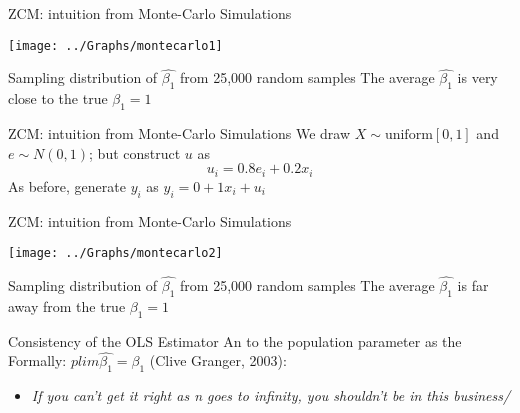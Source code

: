 \begin{frame}{ZCM: intuition from Monte-Carlo Simulations}
\begin{center}
\texttt{[image: ../Graphs/montecarlo1]}
\end{center}
Sampling distribution of $\widehat{\beta_1}$ from 25,000 random samples
\vfill
The average $\widehat{\beta_1}$ is very close to the true $\beta_1=1$
\end{frame}


\begin{frame}{ZCM: intuition from Monte-Carlo Simulations}
\vfill
We draw $X\sim \mbox{uniform}[0,1] $ and $e\sim N(0,1)$; but construct $u$ as 
\begin{equation*}
u_i=0.8 e_i + 0.2 x_i
\end{equation*}
\vfill
As before, generate $y_i$ as  $y_i=0+1 x_i + u_i$
\end{frame}

\begin{frame}{ZCM: intuition from Monte-Carlo Simulations}
\begin{center}
\texttt{[image: ../Graphs/montecarlo2]}
\end{center}
Sampling distribution of $\widehat{\beta_1}$ from 25,000 random samples
\vfill
\pause
The average $\widehat{\beta_1}$ is far away from the true $\beta_1=1$
\vfill
{}
\end{frame}


\begin{frame}{Consistency of the OLS Estimator}
An  to the population parameter as the 
\vfill
Formally: $plim \widehat{\beta_1}=\beta_1$
\vfill
\pause
{} (Clive Granger, 2003):\\
\begin{itemize}
\item \textit{If you can't get it right as n goes to infinity, you shouldn't be in this business/}
\end{itemize}
\end{frame}

